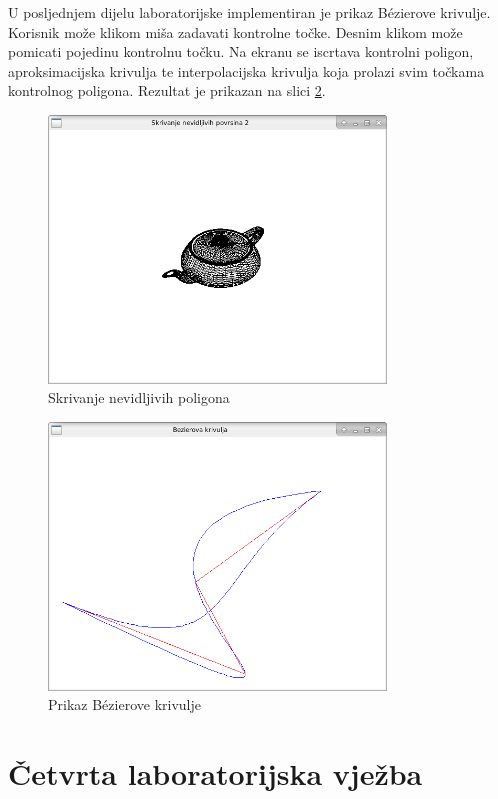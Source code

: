 \documentclass[a4paper,12pt]{article}
\begin{document}
U posljednjem dijelu laboratorijske implementiran je prikaz B{\'e}zierove
krivulje. Korisnik može klikom miša zadavati kontrolne točke. Desnim klikom
može pomicati pojedinu kontrolnu točku. Na ekranu se iscrtava kontrolni poligon,
aproksimacijska krivulja te interpolacijska krivulja koja prolazi svim točkama
kontrolnog poligona. Rezultat je prikazan na slici \ref{fig:bezier}.
\begin{figure}[H]
  \centering
  \includegraphics[width=0.8\textwidth]{img/surface_hiding.png}
  \caption{Skrivanje nevidljivih poligona}
  \label{fig:teapot}
\end{figure}

\begin{figure}[H]
  \centering
  \includegraphics[width=0.8\textwidth]{img/bezier.png}
  \caption{Prikaz B{\'e}zierove krivulje}
  \label{fig:bezier}
\end{figure}

\section{Četvrta laboratorijska vježba}
\end{document}
